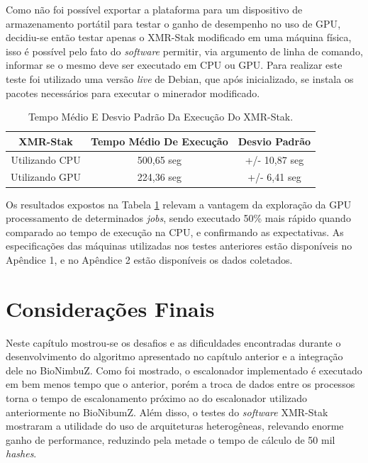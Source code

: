 Como não foi possível exportar a plataforma para um dispositivo de armazenamento portátil para testar o ganho de desempenho no uso de \acrshort{GPU}, decidiu-se então testar apenas o XMR-Stak modificado em uma máquina física, isso é possível pelo fato do \textit{software} permitir, via argumento de linha de comando, informar se o mesmo deve ser executado em \acrshort{CPU} ou \acrshort{GPU}. Para realizar este teste foi utilizado uma versão \textit{live} de Debian, que após inicializado, se instala os pacotes necessários para executar o minerador modificado.

\begin {table}[H]
\label{tabela9}
\begin{center}
	\begin{tabular}{ |c|c|c| } 
		\hline
		XMR-Stak & Tempo Médio De Execução & Desvio Padrão \\ 
		\hline
		Utilizando \acrshort{CPU} & 500,65 seg & +/- 10,87 seg\\ 
		\hline
		Utilizando \acrshort{GPU} & 224,36 seg & +/- 6,41 seg \\ 
		\hline
	\end{tabular}
\caption {Tempo Médio E Desvio Padrão Da Execução Do XMR-Stak.} \label{TabelaTempoCPU} 
\end{center}
\end {table}

Os resultados expostos na Tabela \ref{TabelaTempoCPU} relevam a vantagem da exploração da \acrshort{GPU} processamento de determinados \textit{jobs}, sendo executado 50\% mais rápido quando comparado ao tempo de execução na \acrshort{CPU}, e confirmando as expectativas. As especificações das máquinas utilizadas nos testes anteriores estão disponíveis no Apêndice 1, e no Apêndice 2 estão disponíveis os dados coletados.

\section{Considerações Finais}

Neste capítulo mostrou-se os desafios e as dificuldades encontradas durante o desenvolvimento do algoritmo apresentado no capítulo anterior e a integração dele no BioNimbuZ. Como foi mostrado, o escalonador implementado é executado em bem menos tempo que o anterior, porém a troca de dados entre os processos torna o tempo de escalonamento próximo ao do escalonador utilizado anteriormente no BioNibumZ. Além disso, o testes do \textit{software} XMR-Stak mostraram a utilidade do uso de arquiteturas heterogêneas, relevando enorme ganho de performance, reduzindo pela metade o tempo de cálculo de 50 mil \textit{hashes}.

